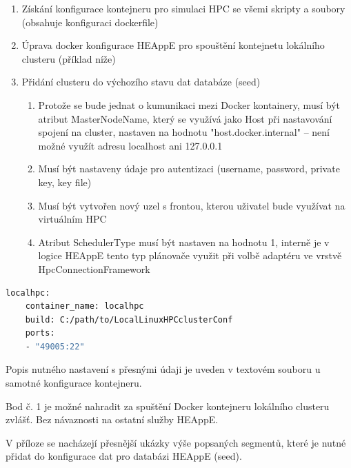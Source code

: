 \begin{enumerate}
	\item Získání konfigurace kontejneru pro simulaci HPC se všemi skripty a soubory (obsahuje konfiguraci dockerfile)
	\item Úprava docker konfigurace HEAppE pro spouštění kontejnetu lokálního clusteru (příklad níže)
	\item Přidání clusteru do výchozího stavu dat databáze (seed)
	\begin{enumerate}
	    \item Protože se bude jednat o kumunikaci mezi Docker kontainery, musí být atribut MasterNodeName, který se využívá jako Host při nastavování spojení na cluster, nastaven na hodnotu "host.docker.internal" – není možné využít adresu localhost ani 127.0.0.1
	    \item Musí být nastaveny údaje pro autentizaci (username, password, private key, key file)
	    \item Musí být vytvořen nový uzel s frontou, kterou uživatel bude využívat na virtuálním HPC
	    \item Atribut SchedulerType musí být nastaven na hodnotu 1, interně je v logice HEAppE tento typ plánovače využit při volbě adaptéru ve vrstvě HpcConnectionFramework
	\end{enumerate}
\end{enumerate}

\begin{lstlisting}[language=Dockerfile,caption={Docker konfigurace pro spouštění kontejnetu lokálního clusteru}]
localhpc:
    container_name: localhpc
    build: C:/path/to/LocalLinuxHPCclusterConf
    ports:
    - "49005:22"
\end{lstlisting}


Popis nutného nastavení s přesnými údaji je uveden v textovém souboru u samotné konfigurace kontejneru.

Bod č. 1 je možné nahradit za spuštění Docker kontejneru lokálního clusteru zvlášť. Bez návaznosti na ostatní služby HEAppE.


V příloze se nacházejí přesnější ukázky výše popsaných segmentů, které je nutné přidat do konfigurace dat pro databázi HEAppE (seed).





